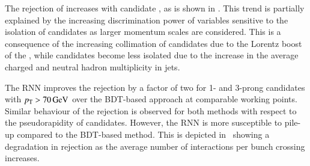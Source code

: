 The \faketauhadvisC rejection of \tauid increases with \tauhadvis
candidate \pT, as is shown in
. This trend is
partially explained by the increasing discrimination power of
variables sensitive to the isolation of \tauhadvis candidates as
larger momentum scales are considered. This is a consequence of the
increasing collimation of \truetauhadvis candidates due to the Lorentz boost of
the \taulepton, while \faketauhadvis candidates become less isolated due to the
increase in the average charged and neutral hadron multiplicity in
jets.


The RNN \tauid improves the \faketauhadvisC rejection by a factor of
two for 1- and 3-prong \tauhadvis candidates with
$\pT > \SI{70}{\GeV}$ over the BDT-based approach at comparable
working points. Similar behaviour of the \faketauhadvisC rejection is
observed for both methods with respect to the pseudorapidity of
\tauhadvis candidates. However, the RNN \tauid is more susceptible to
pile-up compared to the BDT-based method. This is depicted
in~ showing a
degradation in \faketauhadvisC rejection as the average number of
interactions per bunch crossing increases.

